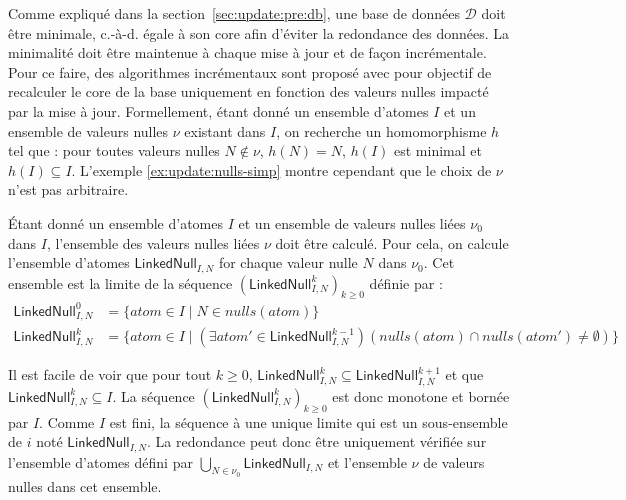 Comme expliqué dans la section~\ref{sec:update:pre:db}, une base de données $\mathcal{D}$ doit être minimale, c.-à-d. égale à son core afin d'éviter la redondance des données.
La minimalité doit être maintenue à chaque mise à jour et de façon incrémentale.
Pour ce faire, des algorithmes incrémentaux sont proposé avec pour objectif de recalculer le core de la base uniquement en fonction des valeurs nulles impacté par la mise à jour.
Formellement, étant donné un ensemble d'atomes $I$ et un ensemble de valeurs nulles $\nu$ existant dans $I$, on recherche un homomorphisme $h$ tel que : pour toutes valeurs nulles $N \notin \nu$, $h(N) = N$, $h(I)$ est minimal et $h(I) \subseteq I$.
L'exemple \ref{ex:update:nulls-simp} montre cependant que le choix de $\nu$ n'est pas arbitraire.

\begin{example}
    \label{ex:update:nulls-simp}
\end{example}

Étant donné un ensemble d'atomes $I$ et un ensemble de valeurs nulles liées $\nu_0$ dans $I$, l'ensemble des valeurs nulles liées $\nu$ doit être calculé.
Pour cela, on calcule l'ensemble d'atomes $\textsf{LinkedNull}_{I,N}$ for chaque valeur nulle $N$ dans $\nu_0$.
Cet ensemble est la limite de la séquence $(\textsf{LinkedNull}^k_{I,N})_{k \ge 0}$ définie par :
\begin{align}
    \textsf{LinkedNull}^0_{I,N} &= \{atom \in I \mid N \in nulls(atom)\} \\
    \textsf{LinkedNull}^k_{I,N} &= \{atom \in I \mid (\exists atom' \in \textsf{LinkedNull}^{k-1}_{I,N})(nulls(atom) \cap nulls(atom') \neq \emptyset)\}
\end{align} 

Il est facile de voir que pour tout $k \geq 0$, $\textsf{LinkedNull}^k_{I,N} \subseteq \textsf{LinkedNull}^{k+1}_{I,N}$ et que $\textsf{LinkedNull}^k_{I,N} \subseteq I$.
La séquence $(\textsf{LinkedNull}^k_{I,N})_{k \ge 0}$ est donc monotone et bornée par $I$.
Comme $I$ est fini, la séquence à une unique limite qui est un sous-ensemble de $i$ noté $\textsf{LinkedNull}_{I,N}$.
La redondance peut donc être uniquement vérifiée sur l'ensemble d'atomes défini par $\bigcup_{N \in \nu_0}\textsf{LinkedNull}_{I,N}$ et l'ensemble $\nu$ de valeurs nulles dans cet ensemble.

